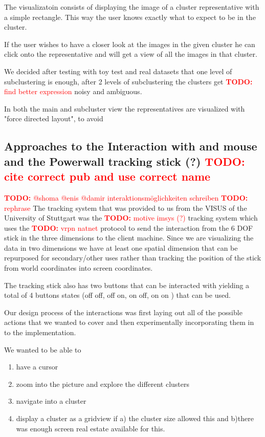 \documentclass[journal]{vgtc}       %
\newcommand{\todo}[1]{\textcolor{red}{\textbf{TODO:} #1}}
\begin{document}
The visualizatoin consists of displaying the image of a cluster representative with a simple rectangle. 
This way the user knows exactly what to expect to be in the cluster.

If the user wishes to have a closer look at the images in the given cluster he can click onto the representative and will get a view of all the images in that cluster.

We decided after testing with toy test and real datasets that one level of subclustering is enough, after 2 levels of subclustering the clusters get \todo{find better expression}  noisy and ambiguous.

In both the main and subcluster view the representatives are visualized with "force directed layout", to avoid 



\subsection{Approaches to the Interaction with and mouse and the Powerwall tracking stick (?) \todo{cite correct pub and use correct name}}

\todo{@shoma @enis @damir interaktionsmöglichkeiten schreiben}
\todo{rephrase}
The tracking system that was provided to us from the VISUS of the University of Stuttgart was the \todo{motive imsys (?)} tracking system which uses the \todo{vrpn natnet} protocol to send the interaction from the 6 DOF stick in the three dimensions to the client machine. 
Since we are visualizing the data in two dimensions we have at least one spatial dimension that can be repurposed for secondary/other uses rather than tracking the position of the stick from world coordinates into screen coordinates.

The tracking stick also has two buttons that can be interacted with yielding a total of 4 buttons states (off off, off on, on off, on on ) that can be used.

Our design process of the interactions was first  laying out all of the possible actions that we wanted to cover and then experimentally incorporating them in to the implementation.

We wanted to be able to 
\begin{enumerate}
  \item have a cursor 
  \item zoom into the picture and  explore the different clusters
  \item navigate into a cluster
  \item display a cluster as a gridview if a) the cluster size allowed this and b)there was enough screen real estate available for this.
  
\end{enumerate}
\end{document}
